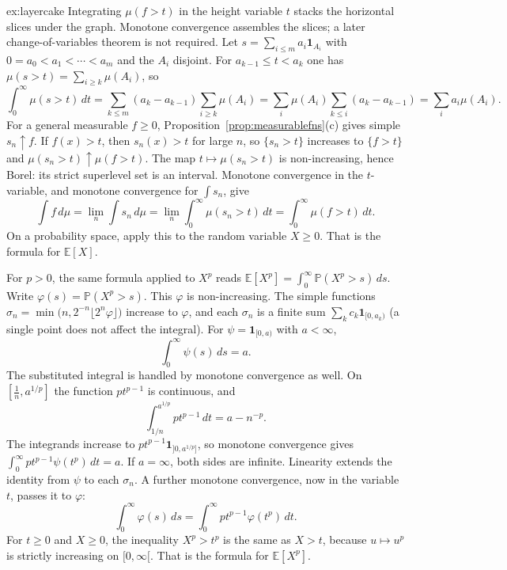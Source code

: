 \begin{solution}{ex:layercake}
\idea Integrating \(\mu(f>t)\) in the height variable \(t\) stacks the horizontal slices under the graph. Monotone convergence assembles the slices; a later change-of-variables theorem is not required.
\writeup Let \(s=\sum_{i\le m}a_i\mathbf 1_{A_i}\) with \(0=a_0<a_1<\cdots<a_m\) and the \(A_i\) disjoint. For \(a_{k-1}\le t<a_k\) one has \(\mu(s>t)=\sum_{i\ge k}\mu(A_i)\), so
\[\int_0^\infty\mu(s>t)\,dt=\sum_{k\le m}(a_k-a_{k-1})\sum_{i\ge k}\mu(A_i)=\sum_i\mu(A_i)\sum_{k\le i}(a_k-a_{k-1})=\sum_ia_i\mu(A_i).\]
For a general measurable \(f\ge0\), Proposition~\ref{prop:measurablefns}(c) gives simple \(s_n\uparrow f\). If \(f(x)>t\), then \(s_n(x)>t\) for large \(n\), so \(\{s_n>t\}\) increases to \(\{f>t\}\) and \(\mu(s_n>t)\uparrow\mu(f>t)\). The map \(t\mapsto\mu(s_n>t)\) is non-increasing, hence Borel: its strict superlevel set is an interval. Monotone convergence in the \(t\)-variable, and monotone convergence for \(\int s_n\), give
\[
\int f\,d\mu=\lim_n\int s_n\,d\mu=\lim_n\int_0^\infty\mu(s_n>t)\,dt=\int_0^\infty\mu(f>t)\,dt.
\]
On a probability space, apply this to the random variable \(X\ge0\). That is the formula for \(\mathbb E[X]\).

For \(p>0\), the same formula applied to \(X^p\) reads \(\mathbb E[X^p]=\int_0^\infty\mathbb P(X^p>s)\,ds\). Write \(\varphi(s)=\mathbb P(X^p>s)\). This \(\varphi\) is non-increasing. The simple functions \(\sigma_n=\min\bigl(n,2^{-n}\lfloor2^n\varphi\rfloor\bigr)\) increase to \(\varphi\), and each \(\sigma_n\) is a finite sum \(\sum_kc_k\mathbf 1_{[0,a_k)}\) (a single point does not affect the integral). For \(\psi=\mathbf 1_{[0,a)}\) with \(a<\infty\),
\[
\int_0^\infty\psi(s)\,ds=a.
\]
The substituted integral is handled by monotone convergence as well. On \([\frac1n,a^{1/p}]\) the function \(pt^{p-1}\) is continuous, and
\[
\int_{1/n}^{a^{1/p}}pt^{p-1}\,dt=a-n^{-p}.
\]
The integrands increase to \(pt^{p-1}\mathbf 1_{]0,a^{1/p}]}\), so monotone convergence gives \(\int_0^\infty pt^{p-1}\psi(t^p)\,dt=a\). If \(a=\infty\), both sides are infinite. Linearity extends the identity from \(\psi\) to each \(\sigma_n\). A further monotone convergence, now in the variable \(t\), passes it to \(\varphi\):
\[
\int_0^\infty\varphi(s)\,ds=\int_0^\infty pt^{p-1}\varphi(t^p)\,dt.
\]
For \(t\ge0\) and \(X\ge0\), the inequality \(X^p>t^p\) is the same as \(X>t\), because \(u\mapsto u^p\) is strictly increasing on \([0,\infty[\). That is the formula for \(\mathbb E[X^p]\).
\end{solution}

